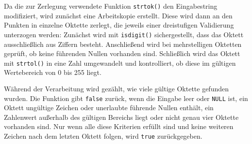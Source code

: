 Da die zur Zerlegung verwendete Funktion \texttt{strtok()} den
Eingabestring modifiziert, wird zunächst eine Arbeitskopie erstellt. Diese wird
dann an den Punkten in einzelne Oktette zerlegt, die jeweils einer dreistufigen
Validierung unterzogen werden: Zunächst wird mit \texttt{isdigit()}
sichergestellt, dass das Oktett ausschließlich aus Ziffern besteht. Anschließend
wird bei mehrstelligen Oktetten geprüft, ob keine führenden Nullen vorhanden
sind. Schließlich wird das Oktett mit \texttt{strtol()} in eine Zahl
umgewandelt und kontrolliert, ob diese im gültigen Wertebereich von 0 bis 255
liegt.

Während der Verarbeitung wird gezählt, wie viele gültige Oktette gefunden
wurden. Die Funktion gibt \texttt{false} zurück, wenn die Eingabe leer
oder \texttt{NULL} ist, ein Oktett ungültige Zeichen oder unerlaubte
führende Nullen enthält, ein Zahlenwert außerhalb des gültigen Bereichs liegt
oder nicht genau vier Oktette vorhanden sind. Nur wenn alle diese Kriterien
erfüllt sind und keine weiteren Zeichen nach dem letzten Oktett folgen, wird
\texttt{true} zurückgegeben.

